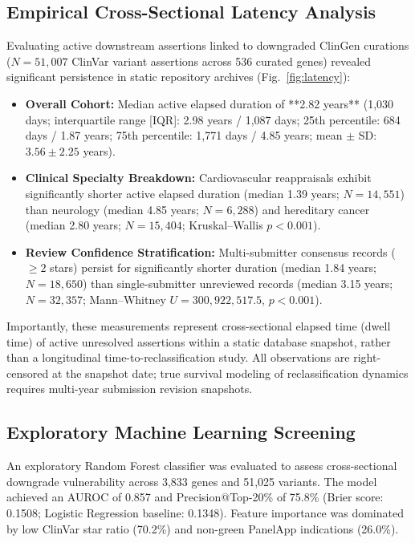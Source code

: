 \documentclass[conference]{IEEEtran}
\begin{document}
\subsection{Empirical Cross-Sectional Latency Analysis}
Evaluating active downstream assertions linked to downgraded ClinGen curations ($N = 51,007$ ClinVar variant assertions across 536 curated genes) revealed significant persistence in static repository archives (Fig.~\ref{fig:latency}):
\begin{itemize}
    \item \textbf{Overall Cohort:} Median active elapsed duration of **2.82 years** (1,030 days; interquartile range [IQR]: 2.98 years / 1,087 days; 25th percentile: 684 days / 1.87 years; 75th percentile: 1,771 days / 4.85 years; mean $\pm$ SD: $3.56 \pm 2.25$ years).
    \item \textbf{Clinical Specialty Breakdown:} Cardiovascular reappraisals exhibit significantly shorter active elapsed duration (median 1.39 years; $N = 14,551$) than neurology (median 4.85 years; $N = 6,288$) and hereditary cancer (median 2.80 years; $N = 15,404$; Kruskal--Wallis $p < 0.001$).
    \item \textbf{Review Confidence Stratification:} Multi-submitter consensus records ($\ge 2$ stars) persist for significantly shorter duration (median 1.84 years; $N = 18,650$) than single-submitter unreviewed records (median 3.15 years; $N = 32,357$; Mann--Whitney $U = 300,922,517.5$, $p < 0.001$).
\end{itemize}
Importantly, these measurements represent cross-sectional elapsed time (dwell time) of active unresolved assertions within a static database snapshot, rather than a longitudinal time-to-reclassification study. All observations are right-censored at the snapshot date; true survival modeling of reclassification dynamics requires multi-year submission revision snapshots.

\subsection{Exploratory Machine Learning Screening}
An exploratory Random Forest classifier was evaluated to assess cross-sectional downgrade vulnerability across 3,833 genes and 51,025 variants. The model achieved an AUROC of 0.857 and Precision@Top-20\% of 75.8\% (Brier score: 0.1508; Logistic Regression baseline: 0.1348). Feature importance was dominated by low ClinVar star ratio (70.2\%) and non-green PanelApp indications (26.0\%). 
\end{document}
